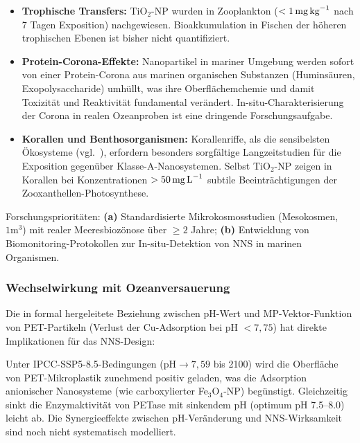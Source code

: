 ﻿\documentclass[12pt,a4paper]{article}
\theoremstyle{definition}
\theoremstyle{remark}
\begin{document}
\begin{itemize}
  \item \textbf{Trophische Transfers:} TiO$_2$-NP wurden in Zooplankton
        ($< 1\,\text{mg\,kg}^{-1}$ nach 7 Tagen Exposition) nachgewiesen.
        Bioakkumulation in Fischen der höheren trophischen Ebenen ist bisher
        nicht quantifiziert.
  \item \textbf{Protein-Corona-Effekte:} Nanopartikel in mariner Umgebung
        werden sofort von einer Protein-Corona aus marinen organischen
        Substanzen (Huminsäuren, Exopolysaccharide) umhüllt, was ihre
        Oberflächemchemie und damit Toxizität und Reaktivität fundamental
        verändert. In-situ-Charakterisierung der Corona in realen
        Ozeanproben ist eine dringende Forschungsaufgabe.
  \item \textbf{Korallen und Benthosorganismen:} Korallenriffe, als die
        sensibelsten Ökosysteme (vgl.\ \cite{ocnscnce_epp2026}), erfordern
        besonders sorgfältige Langzeitstudien für die Exposition gegenüber
        Klasse-A-Nanosystemen. Selbst TiO$_2$-NP zeigen in Korallen
        bei Konzentrationen $> 50\,\text{mg\,L}^{-1}$ subtile Beeinträchtigungen
        der Zooxanthellen-Photosynthese.
\end{itemize}

Forschungsprioritäten: \textbf{(a)} Standardisierte Mikrokosmosstudien
(Mesokosmen, $1\text{m}^3$) mit realer Meeresbiozönose über $\geq 2$ Jahre;
\textbf{(b)} Entwicklung von Biomonitoring-Protokollen zur In-situ-Detektion
von NNS in marinen Organismen.

\subsubsection{Wechselwirkung mit Ozeanversauerung}

Die in \cite{ocnscnce_epp2026} formal hergeleitete Beziehung zwischen
pH-Wert und MP-Vektor-Funktion von PET-Partikeln (Verlust der Cu-Adsorption
bei pH $< 7{,}75$) hat direkte Implikationen für das NNS-Design:

Unter IPCC-SSP5-8.5-Bedingungen ($\text{pH} \to 7{,}59$ bis 2100) wird die
Oberfläche von PET-Mikro\-plastik zunehmend positiv geladen, was die
Adsorption anionischer Nanosysteme (wie carboxylierter Fe$_3$O$_4$-NP)
begünstigt. Gleichzeitig sinkt die Enzymaktivität von PETase mit sinkendem
pH (optimum pH 7.5--8.0) leicht ab. Die Synergieeffekte zwischen
pH-Veränderung und NNS-Wirksamkeit sind noch nicht systematisch modelliert.
\end{document}
